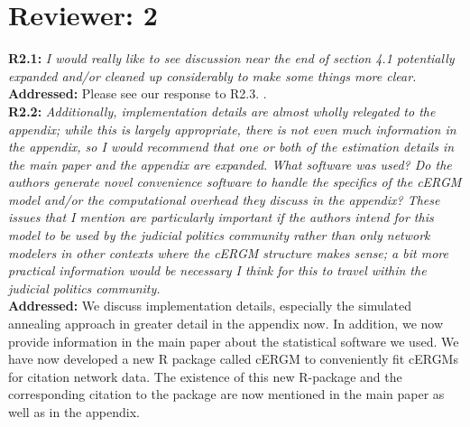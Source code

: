 \documentclass[a4paper,11pt]{texMemo}
\begin{document}
\newpage
\section*{Reviewer: 2}


\noindent \textbf{R2.1:} \emph{ I would really like to see discussion near the end of section 4.1 potentially expanded and/or cleaned up considerably to make some things more clear.}\\

\noindent \textbf{Addressed:}  Please see our response to R2.3. .\\

\noindent \textbf{R2.2:} \emph{ Additionally, implementation details are almost wholly relegated to the appendix; while this is largely appropriate, there is not even much information in the appendix, so I would recommend that one or both of the estimation details in the main paper and the appendix are expanded. What software was used? Do the authors generate novel convenience software to handle the specifics of the cERGM model and/or the computational overhead they discuss in the appendix? These issues that I mention are particularly important if the authors intend for this model to be used by the judicial politics community rather than only network modelers in other contexts where the cERGM structure makes sense; a bit more practical information would be necessary I think for this to travel within the judicial politics community.}\\

\noindent \textbf{Addressed:}  We discuss implementation details, especially the simulated annealing approach in greater detail in the appendix now. In addition, we now provide information in the main paper about the statistical software we used. We have now developed a new R package called cERGM to conveniently fit cERGMs for citation network data. The existence of this new R-package and the corresponding citation to the package are now mentioned in the main paper as well as in the appendix. \\
\end{document}
